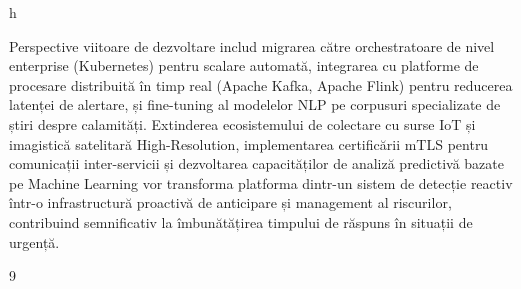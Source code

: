 h\documentclass[12pt,a4paper]{article}
\begin{document}
 Perspective viitoare de dezvoltare includ migrarea către orchestratoare de nivel enterprise (Kubernetes) pentru scalare automată, integrarea cu platforme de procesare distribuită în timp real (Apache Kafka, Apache Flink) pentru reducerea latenței de alertare, și fine-tuning al modelelor NLP pe corpusuri specializate de știri despre calamități. Extinderea ecosistemului de colectare cu surse IoT și imagistică satelitară High-Resolution, implementarea certificării mTLS pentru comunicații inter-servicii și dezvoltarea capacităților de analiză predictivă bazate pe Machine Learning vor transforma platforma dintr-un sistem de detecție reactiv într-o infrastructură proactivă de anticipare și management al riscurilor, contribuind semnificativ la îmbunătățirea timpului de răspuns în situații de urgență.


\newpage
{}
{}
\begin{thebibliography}{9}




\end{thebibliography}



\end{document}
